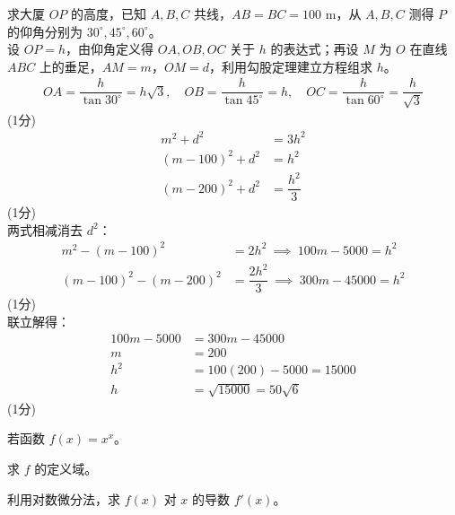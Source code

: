\documentclass[12pt,a4paper]{exam-zh}
\newcommand{\qscoreoffset}{4em}
\newcommand{\qscore}[1]{%
    \leavevmode\unskip\nobreak\hfill
    \makebox[0pt][l]{\makebox[\qscoreoffset][r]{(#1\%)}}%
}
\begin{document}
\begin{solution}
    求大厦 $OP$ 的高度，已知 $A,B,C$ 共线，$AB=BC=100\text{ m}$，从 $A,B,C$ 测得 $P$ 的仰角分别为 $30^\circ,45^\circ,60^\circ$。\\
    设 $OP=h$，由仰角定义得 $OA,OB,OC$ 关于 $h$ 的表达式；再设 $M$ 为 $O$ 在直线 $ABC$ 上的垂足，$AM=m$，$OM=d$，利用勾股定理建立方程组求 $h$。
    \begin{align*}
        OA=\dfrac{h}{\tan30^\circ}=h\sqrt3, \quad OB=\dfrac{h}{\tan45^\circ}=h, \quad OC=\dfrac{h}{\tan60^\circ}=\dfrac{h}{\sqrt3}
    \end{align*}
    \hfill (1分) \\
    \begin{align*}
        m^2+d^2 &= 3h^2 \\
        (m-100)^2+d^2 &= h^2 \\
        (m-200)^2+d^2 &= \dfrac{h^2}{3}
    \end{align*}
    \hfill (1分) \\
    两式相减消去 $d^2$：
    \begin{align*}
        m^2-(m-100)^2 &= 2h^2 \ \implies\ 100m-5000=h^2 \\
        (m-100)^2-(m-200)^2 &= \dfrac{2h^2}{3} \ \implies\ 300m-45000=h^2
    \end{align*}
    \hfill (1分) \\
    联立解得：
    \begin{align*}
        100m-5000 &= 300m-45000 \\
        m &= 200 \\
        h^2 &= 100(200)-5000 = 15000 \\
        h &= \sqrt{15000} = 50\sqrt6
    \end{align*}
    \hfill (1分)
\end{solution}

\begin{question}[points = 4]
    若函数 $f(x) = x^x$。

    \begin{questionparts}
        \item 求 $f$ 的定义域。 \qscore{1}

        \item 利用对数微分法，求 $f(x)$ 对 $x$ 的导数 $f'(x)$。 \qscore{3}
    \end{questionparts}
\end{question}
\end{document}
